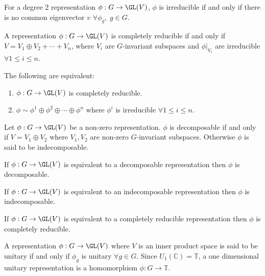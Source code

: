 \documentclass[../Project.tex]{subfiles}
\begin{document}
\begin{prop}[\cite {1}]
	For a degree 2 representation $\phi : G \to \GL(V)$, $\phi$ is irreducible if and only if there is no common eigenvector $v$ $\forall \phi_g,\;g \in G$.
\end{prop}

\begin{defi}
	A representation $\phi : G \to \GL(V)$ is completely reducible if and only if $V = V_1 \oplus V_2 + \cdots + V_n$, where $V_i$ are $G$-invariant subspaces and $\phi\vert_{V_i}$ are irreducible $\forall 1 \leqslant i \leqslant n$.
\end{defi}

\begin{prop}[\cite{1}]
	The following are equivalent:
	\begin{enumerate}
		\item $\phi : G \to \GL(V)$ is completely reducible.
		\item $\phi \sim \phi^1 \oplus \phi^2 \oplus \cdots \oplus \phi^n$ where $\phi^i$ is irreducible $\forall 1 \leqslant i \leqslant n$.
	\end{enumerate}
\end{prop}


\begin{defi}
	Let $\phi : G \to \GL(V)$ be a non-zero representation. $\phi$ is decomposable if and only if $V = V_1 \oplus V_2$ where $V_1,V_2$ are non-zero $G$-invariant subspaces. Otherwise $\phi$ is said to be indecomposable.
\end{defi}

\begin{lemm}[\cite{1}]
	If $\phi : G \to \GL(V)$ is equivalent to a decomposable representation then $\phi$ is decomposable.
\end{lemm}

\begin{lemm}[\cite{1}]
	If $\phi : G \to \GL(V)$ is equivalent to an indecomposable representation then $\phi$ is indecomposable.
\end{lemm}

\begin{lemm}[\cite{1}]
	If $\phi : G \to \GL(V)$ is equivalent to a completely reducible representation then $\phi$ is completely reducible.
\end{lemm}


\begin{defi}
	A representation $\phi : G \to \GL(V)$ where $V$ is an inner product space is said to be unitary if and only if $\phi_g$ is unitary $\forall g \in G$. Since $U_1(\mathbb{C}) = \mathbb{T}$, a one dimensional unitary representation is a homomorphism $\phi : G \to \mathbb{T}$.
\end{defi}
\end{document}

